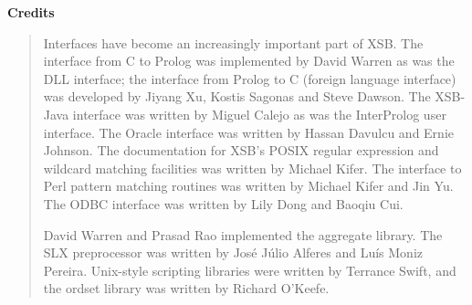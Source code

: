 
\begin{center}
{\bf {\Large 
		Credits
}}
\end{center}


\begin{quote}
  Interfaces have become an increasingly important part of XSB.  The
  interface from C to Prolog was implemented by David Warren as was the DLL
  interface; the interface from Prolog to C (foreign language interface)
  was developed by Jiyang Xu, Kostis Sagonas and Steve Dawson.  The
  XSB-Java interface was written by Miguel Calejo as was the InterProlog
  user interface.  The Oracle interface was written by Hassan Davulcu and
  Ernie Johnson. The documentation for XSB's POSIX regular expression and
  wildcard matching facilities was written by Michael Kifer.  The interface
  to Perl pattern matching routines was written by Michael Kifer and Jin
  Yu.  The ODBC interface was written by Lily Dong and Baoqiu Cui.
  
  David Warren and Prasad Rao implemented the aggregate library.  The SLX
  preprocessor was written by Jos\'e J\'ulio Alferes and Lu\'is Moniz
  Pereira.  Unix-style scripting libraries were written by Terrance Swift,
  and the ordset library was written by Richard O'Keefe.
\end{quote}

